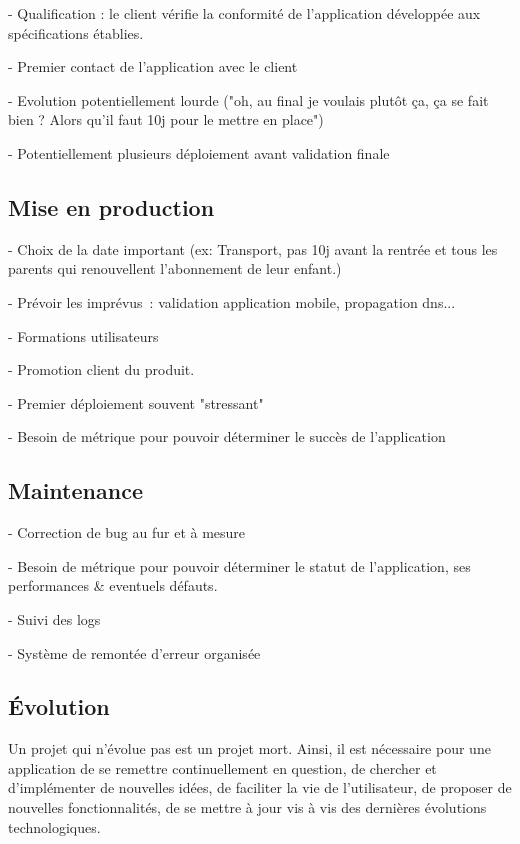 - Qualification : le client vérifie la conformité de l’application développée aux spécifications établies.

- Premier contact de l'application avec le client

- Evolution potentiellement lourde ("oh, au final je voulais plutôt ça, ça se fait bien ? Alors qu'il faut 10j pour le mettre en place")

- Potentiellement plusieurs déploiement avant validation finale

\subsection{Mise en production}

- Choix de la date important (ex: Transport, pas 10j avant la rentrée et tous les parents qui renouvellent l'abonnement de leur enfant.)

- Prévoir les imprévus : validation application mobile, propagation dns...

- Formations utilisateurs

- Promotion client du produit.

- Premier déploiement souvent "stressant"

- Besoin de métrique pour pouvoir déterminer le succès de l'application


\subsection{Maintenance}

- Correction de bug au fur et à mesure

- Besoin de métrique pour pouvoir déterminer le statut de l'application, ses performances \& eventuels défauts.

- Suivi des logs 

- Système de remontée d'erreur organisée


\subsection{Évolution}

Un projet qui n'évolue pas est un projet mort. Ainsi, il est nécessaire pour une application de se remettre continuellement en question, de chercher et d'implémenter de nouvelles idées, de faciliter la vie de l'utilisateur, de proposer de nouvelles fonctionnalités, de se mettre à jour vis à vis des dernières évolutions technologiques.

